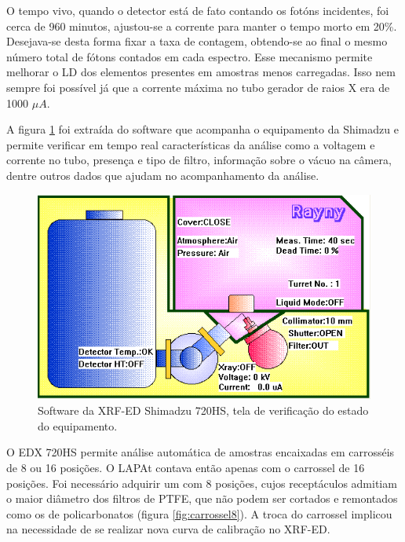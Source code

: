 O tempo vivo, quando o detector está de fato contando os fotóns incidentes, 
foi cerca de 960 minutos, ajustou-se 
a corrente para manter o tempo morto em 20\%. Desejava-se desta forma fixar a 
taxa de contagem, obtendo-se ao final o mesmo número total de fótons contados 
em cada espectro. Esse mecanismo permite melhorar o LD dos elementos presentes 
em amostras menos carregadas. Isso nem sempre foi possível já que a corrente 
máxima no tubo gerador de raios X era de 1000 $\mu A$. 

A figura \ref{fig:xrfed_software} foi extraída do software que acompanha o 
equipamento da Shimadzu e permite verificar em tempo real características
da análise como a voltagem e corrente no tubo, presença e tipo de filtro, 
informação sobre o vácuo na câmera, dentre outros dados que ajudam no 
acompanhamento da análise. 

\begin{figure}[H]
  \centering
  \includegraphics[scale=0.4]{../inputs/images/edx_iag_monitor.png}
  \caption{Software da XRF-ED Shimadzu 720HS, tela de verificação 
           do estado do equipamento. \label{fig:xrfed_software}}
\end{figure}

O EDX 720HS permite análise automática de amostras encaixadas em carrosséis 
de 8 ou 16 posições. O LAPAt contava então apenas com o carrossel de 16 
posições. Foi necessário adquirir um com 8 posições, cujos receptáculos admitiam
o maior diâmetro dos filtros de PTFE, que não podem ser cortados e remontados 
como os de policarbonatos (figura \ref{fig:carrossel8}). A troca do carrossel
implicou na necessidade de se realizar nova curva de calibração no XRF-ED. 

